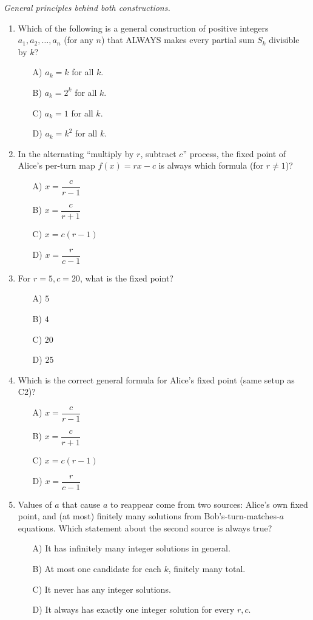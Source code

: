 \documentclass[11pt,a4paper]{article}
\begin{document}
\noindent\textit{General principles behind both constructions.}

\begin{enumerate}

\item Which of the following is a general construction of positive integers $a_1,a_2,\ldots,a_n$ (for any $n$) that ALWAYS makes every partial sum $S_k$ divisible by $k$?
\begin{itemize}
\item[A)] $a_k=k$ for all $k$.
\item[B)] $a_k=2^k$ for all $k$.
\item[C)] $a_k=1$ for all $k$.
\item[D)] $a_k=k^2$ for all $k$.
\end{itemize}

\item In the alternating ``multiply by $r$, subtract $c$'' process, the fixed point of Alice's per-turn map $f(x)=rx-c$ is always which formula (for $r\neq1$)?
\begin{itemize}
\item[A)] $x=\dfrac c{r-1}$
\item[B)] $x=\dfrac c{r+1}$
\item[C)] $x=c(r-1)$
\item[D)] $x=\dfrac r{c-1}$
\end{itemize}

\item For $r=5,c=20$, what is the fixed point?
\begin{itemize}
\item[A)] $5$
\item[B)] $4$
\item[C)] $20$
\item[D)] $25$
\end{itemize}

\item Which is the correct general formula for Alice's fixed point (same setup as C2)?
\begin{itemize}
\item[A)] $x=\dfrac c{r-1}$
\item[B)] $x=\dfrac c{r+1}$
\item[C)] $x=c(r-1)$
\item[D)] $x=\dfrac r{c-1}$
\end{itemize}

\item Values of $a$ that cause $a$ to reappear come from two sources: Alice's own fixed point, and (at most) finitely many solutions from Bob's-turn-matches-$a$ equations. Which statement about the second source is always true?
\begin{itemize}
\item[A)] It has infinitely many integer solutions in general.
\item[B)] At most one candidate for each $k$, finitely many total.
\item[C)] It never has any integer solutions.
\item[D)] It always has exactly one integer solution for every $r,c$.
\end{itemize}


\end{enumerate}
\end{document}
